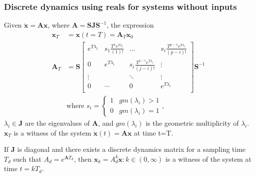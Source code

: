 \documentclass[sigconf]{llncs}
\newcommand{\mat}[1]{\boldsymbol{#1}}
\renewcommand{\vec}[1]{\boldsymbol{#1}}
\begin{document}
 \subsubsection{Discrete dynamics using reals for systems without inputs}\label{sec:real_discrete_no_inputs}
 \begin{theorem}
 Given $\dot{\vec{x}}=\mat{A}\vec{x}$, where $\mat{A}=\mat{S}\mat{J}\mat{S}^{-1}$, the expression
 \begin{align}
 \vec{x}_T&=\vec{x}(t=T)=\mat{A}_{T}\vec{x}_0\\
 \mat{A}_{T}&= \mat{S}
 \left [ \begin{array}{cccc}
 e^{T\lambda_1}  & s_1\frac{T^{1}e^{T\lambda_i}}{(1)!} & \hdots  & s_i\frac{T^{p-1}e^{T\lambda_i}}{(p-i)!} \\
0 & e^{T\lambda_i}  & s_i\frac{T^{j-i}e^{T\lambda_i}}{(j-i)!} & \vdots \\
\vdots & & \ddots & \vdots \\
0 & \cdots & 0  &e^{T\lambda_i} \\
\end{array} \right ]
 \mat{S}^{-1}
 \label{eq:continuous_tube_dyn}\\
 &\text{where } s_i=\left\{\begin{array}{cc}1&gm(\lambda_i)>1\\0&gm(\lambda_i)=1\end{array}\right.,\nonumber
 \end{align}
$\lambda_i \in \mat{J}$ are the eigenvalues of $\mat{A}$, and $gm(\lambda_i)$ is the geometric multiplicity of $\lambda_i$.  $\vec{x}_T$ is a witness of the system $\dot{\vec{x}}(t)=\mat{A}\vec{x}$ at time t=T.
 \end{theorem}
 \begin{corollary}
 If $\mat{J}$ is diagonal and there exists a discrete dynamics matrix for a sampling time $T_d$ such that $A_d=e^{\mat{A} T_d}$, then $\vec{x}_k=A_d^k\vec{x} : k \in (0,\infty)$ is a witness of the system at time $t=kT_d$.
 \end{corollary}
\end{document}
